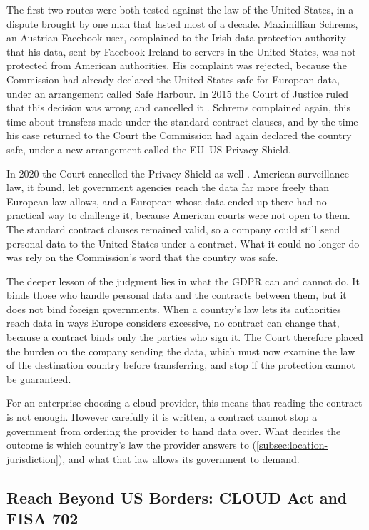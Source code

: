 The first two routes were both tested against the law of the United States, in a
dispute brought by one man that lasted most of a decade. Maximillian Schrems, an
Austrian Facebook user, complained to the Irish data protection authority that his
data, sent by Facebook Ireland to servers in the United States, was not protected
from American authorities. His complaint was rejected, because the Commission had
already declared the United States safe for European data, under an arrangement
called Safe Harbour. In 2015 the Court of Justice ruled that this decision was wrong and cancelled it
\cite{SchremsI_2015}. Schrems complained again, this time about transfers made
under the standard contract clauses, and by the time his case returned to the Court
the Commission had again declared the country safe, under a new arrangement called
the \ac{EU}--US Privacy Shield.

In 2020 the Court cancelled the Privacy Shield as well \cite{SchremsII_2020}. American
surveillance law, it found, let government agencies reach the data far more freely
than European law allows, and a European whose data ended up there had no
practical way to challenge it, because American courts were not open to them. The
standard contract clauses remained valid, so a company could still send personal data to
the United States under a contract. What it could no longer do was rely on the
Commission's word that the country was safe.

The deeper lesson of the judgment lies in what the \ac{GDPR} can and cannot do. It
binds those who handle personal data and the contracts between them, but it does
not bind foreign governments. When a country's law lets its authorities reach data
in ways Europe considers excessive, no contract can change that, because a contract
binds only the parties who sign it. The Court therefore placed the burden on the
company sending the data, which must now examine the law of the destination country
before transferring, and stop if the protection cannot be guaranteed.

For an enterprise choosing a cloud provider, this means that reading the contract
is not enough. However carefully it is written, a contract cannot stop a government
from ordering the provider to hand data over. What decides the outcome is which
country's law the provider answers to (\cref{subsec:location-jurisdiction}), and
what that law allows its government to demand.

\subsection{Reach Beyond US Borders: CLOUD Act and FISA 702}
\label{subsec:cloud-act}

